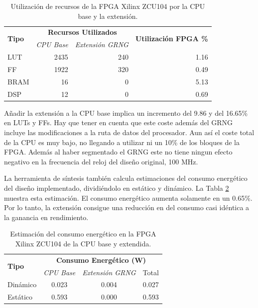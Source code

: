 \begin{table}[h]
\centering
\caption{Utilización de recursos de la FPGA Xilinx ZCU104 por la CPU base y la extensión.}
\label{tab:riscv_fpga_utilization}
\begin{tabular}{lrrr}
\hline
\multirow{2}{*}{\textbf{Tipo}} & \multicolumn{2}{c}{\textbf{Recursos Utilizados}} & \multirow{2}{*}{\textbf{Utilización FPGA \%}}\\
 & \textit{CPU Base} & \textit{Extensión GRNG} & \\ \hline
LUT	        & 2435 & 240 & 1.16 \\
FF	        & 1922 & 320 & 0.49 \\
BRAM	    & 16   & 0 & 5.13 \\
DSP	        & 12   & 0 & 0.69 \\ \hline
\end{tabular}
\end{table}

Añadir la extensión a la CPU base implica un incremento del 9.86 y del 16.65\% en LUTs y FFs. Hay que tener en cuenta que este coste además del GRNG incluye las modificaciones a la ruta de datos del procesador. Aun así el coste total de la CPU es muy bajo, no llegando a utilizar ni un 10\% de los bloques de la FPGA. Además al haber segmentado el GRNG este no tiene ningun efecto negativo en la frecuencia del reloj del diseño original, 100 MHz.

La herramienta de síntesis también calcula estimaciones del consumo energético del diseño implementado, dividiéndolo en estático y dinámico. La Tabla \ref{tab:riscv_fpga_power} muestra esta estimación. El consumo energético aumenta solamente en un 0.65\%. Por lo tanto, la extensión consigue una reducción en del consumo casi idéntica a la ganancia en rendimiento.

\begin{table}[h]
\centering
\caption{Estimación del consumo energético en la FPGA Xilinx ZCU104 de la CPU base y extendida.}
\label{tab:riscv_fpga_power}
\begin{tabular}{lccc}
\hline
\multirow{2}{*}{\textbf{Tipo}} & \multicolumn{3}{c}{\textbf{Consumo Energético (W)}} \\
 & \textit{CPU Base} & \textit{Extensión GRNG} & Total \\ \hline
Dinámico & 0.023 & 0.004 & 0.027\\
Estático & 0.593 & 0.000 & 0.593\\ \hline
\end{tabular}
\end{table}
